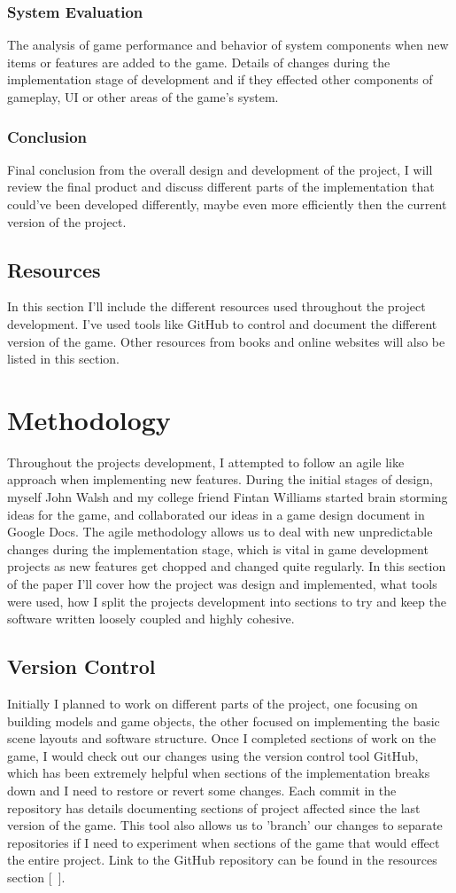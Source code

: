 \subsection{System Evaluation}
The analysis of game performance and behavior of system components when new items or features are added to the game. Details of changes during the implementation stage of development and if they effected other components of gameplay, UI or other areas of the game's system.
\subsection{Conclusion}
Final conclusion from the overall design and development of the project, I will review the final product and discuss different parts of the implementation that could've been developed differently, maybe even more efficiently then the current version of the project.
\section{Resources}
In this section I'll include the different resources used throughout the project development. I've used tools like GitHub to control and document the different version of the game. Other resources from books and online websites will also be listed in this section.
\chapter{Methodology}
Throughout the projects development, I attempted to follow an agile like approach when implementing new features. During the initial stages of design, myself John Walsh and my college friend Fintan Williams started brain storming ideas for the game, and collaborated our ideas in a game design document in Google Docs. The agile methodology allows us to deal with new unpredictable changes during the implementation stage, which is vital in game development projects as new features get chopped and changed quite regularly. In this section of the paper I'll cover how the project was design and implemented, what tools were used, how I split the projects development into sections to try and keep the software written loosely coupled and highly cohesive.
\section{Version Control}
Initially I planned to work on different parts of the project, one focusing on building models and game objects, the other focused on implementing the basic scene layouts and software structure. Once I completed sections of work on the game, I would check out our changes using the version control tool GitHub, which has been extremely helpful when sections of the implementation breaks down and I need to restore or revert some changes. Each commit in the repository has details documenting sections of project affected since the last version of the game. This tool also allows us to 'branch' our changes to separate repositories if I need to experiment when sections of the game that would effect the entire project. Link to the GitHub repository can be found in the resources section [~\cite{GitHub}].
